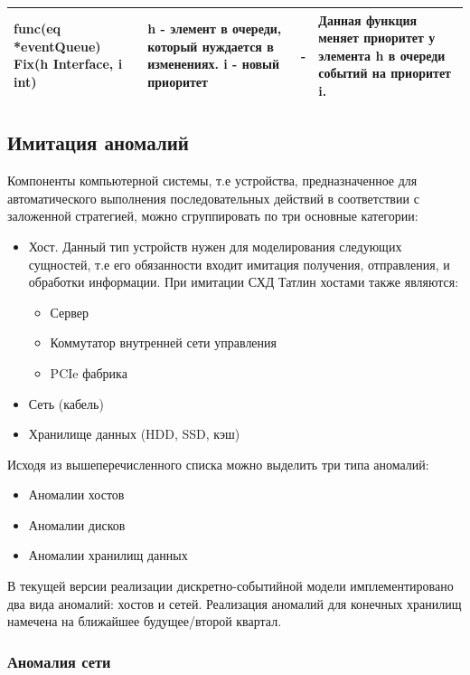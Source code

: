 \begin{table}[]
\begin{tabularx}{\textwidth}{|X|X|X|X|}
func(eq *eventQueue) Fix(h Interface, i int) & h - элемент в очереди, который нуждается в изменениях. i - новый приоритет & -                                               & Данная функция меняет приоритет у элемента h в очереди событий на приоритет i.                                                                                                                                           \\ \hline
\end{tabularx}
\end{table}

\subsection{Имитация аномалий}

Компоненты компьютерной системы, т.е устройства, предназначенное для автоматического выполнения последовательных действий в соответствии с заложенной стратегией, можно сгруппировать по три основные категории:
\begin{itemize}
\item Хост. Данный тип устройств нужен для моделирования следующих сущностей, т.е его обязанности входит имитация получения, отправления, и обработки информации. При имитации СХД Татлин  хостами также являются:
	\begin{itemize}
		\item Сервер
		\item Коммутатор внутренней сети управления
		\item PCIe фабрика 
	\end{itemize}
\item Сеть (кабель)
\item Хранилище данных (HDD, SSD, кэш)
\end{itemize}
Исходя из вышеперечисленного списка можно выделить три типа аномалий:
\begin{itemize}
\item Аномалии хостов
\item Аномалии дисков
\item Аномалии хранилищ данных
\end{itemize}
 В текущей версии реализации дискретно-событийной модели имплементировано два вида аномалий: хостов и сетей. Реализация аномалий для конечных хранилищ намечена на ближайшее будущее/второй квартал.

\subsubsection{Аномалия сети}

